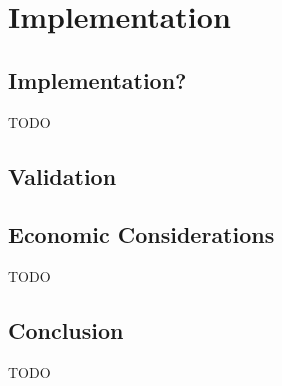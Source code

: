 \chapter{Implementation}
\label{chap:impl}

\section{Implementation?}

TODO

\section{Validation}

\section{Economic Considerations}

TODO

\section{Conclusion}

TODO